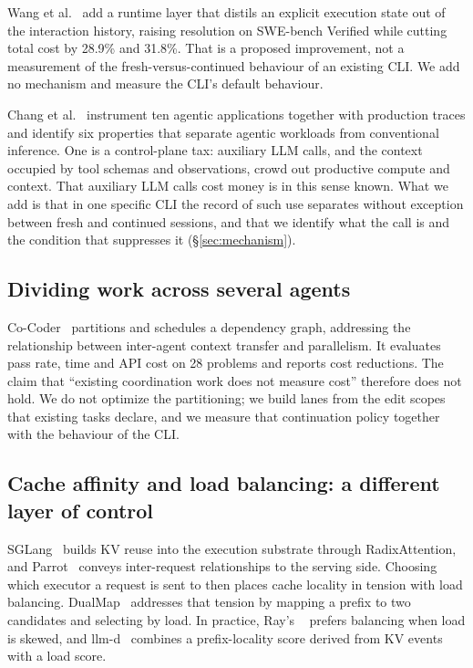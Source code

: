 \documentclass[a4paper,11pt]{article}
\newcommand{\spec}[1]{\texttt{\detokenize{#1}}}
\begin{document}
Wang et al.~\cite{ledger} add a runtime layer that distils an explicit execution state out of the interaction history, raising resolution on SWE-bench Verified while cutting total cost by 28.9\% and 31.8\%. That is a proposed improvement, not a measurement of the fresh-versus-continued behaviour of an existing CLI. We add no mechanism and measure the CLI's default behaviour.

Chang et al.~\cite{agenticworkloads} instrument ten agentic applications together with production traces and identify six properties that separate agentic workloads from conventional inference. One is a control-plane tax: auxiliary LLM calls, and the context occupied by tool schemas and observations, crowd out productive compute and context. That auxiliary LLM calls cost money is in this sense known. What we add is that in one specific CLI the record of such use separates without exception between fresh and continued sessions, and that we identify what the call is and the condition that suppresses it (\S\ref{sec:mechanism}).

\subsection{Dividing work across several agents}
Co-Coder~\cite{cocoder} partitions and schedules a dependency graph, addressing the relationship between inter-agent context transfer and parallelism. It evaluates pass rate, time and API cost on 28 problems and reports cost reductions. The claim that ``existing coordination work does not measure cost'' therefore does not hold. We do not optimize the partitioning; we build lanes from the edit scopes that existing tasks declare, and we measure that continuation policy together with the behaviour of the CLI.

\subsection{Cache affinity and load balancing: a different layer of control}
SGLang~\cite{sglang} builds KV reuse into the execution substrate through RadixAttention, and Parrot~\cite{parrot} conveys inter-request relationships to the serving side. Choosing which executor a request is sent to then places cache locality in tension with load balancing. DualMap~\cite{dualmap} addresses that tension by mapping a prefix to two candidates and selecting by load. In practice, Ray's \spec{PrefixCacheAffinityRouter}~\cite{rayprefix} prefers balancing when load is skewed, and llm-d~\cite{llmdprefix} combines a prefix-locality score derived from KV events with a load score.
\end{document}
